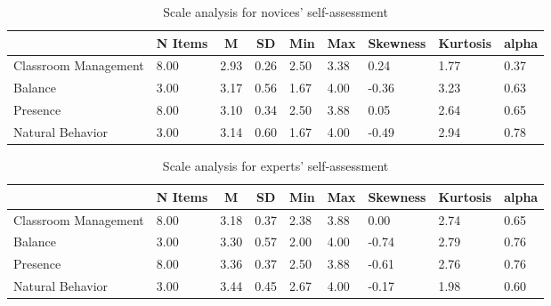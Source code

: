 \documentclass[
  man]{apa6}
\begin{document}
\begin{table}[h]

\begin{center}
\begin{threeparttable}

\caption{\label{tab:presence_questionnaire_novices}Scale analysis for novices' self-assessment}

\tiny{

\begin{tabular}{lllllllll}
\toprule
 & \multicolumn{1}{c}{N Items} & \multicolumn{1}{c}{M} & \multicolumn{1}{c}{SD} & \multicolumn{1}{c}{Min} & \multicolumn{1}{c}{Max} & \multicolumn{1}{c}{Skewness} & \multicolumn{1}{c}{Kurtosis} & \multicolumn{1}{c}{alpha}\\
\midrule
Classroom Management & 8.00 & 2.93 & 0.26 & 2.50 & 3.38 & 0.24 & 1.77 & 0.37\\
Balance & 3.00 & 3.17 & 0.56 & 1.67 & 4.00 & -0.36 & 3.23 & 0.63\\
Presence & 8.00 & 3.10 & 0.34 & 2.50 & 3.88 & 0.05 & 2.64 & 0.65\\
Natural Behavior & 3.00 & 3.14 & 0.60 & 1.67 & 4.00 & -0.49 & 2.94 & 0.78\\
\bottomrule
\end{tabular}

}

\end{threeparttable}
\end{center}

\end{table}

\begin{table}[h]

\begin{center}
\begin{threeparttable}

\caption{\label{tab:presence_questionnaire_experts}Scale analysis for experts' self-assessment}

\tiny{

\begin{tabular}{lllllllll}
\toprule
 & \multicolumn{1}{c}{N Items} & \multicolumn{1}{c}{M} & \multicolumn{1}{c}{SD} & \multicolumn{1}{c}{Min} & \multicolumn{1}{c}{Max} & \multicolumn{1}{c}{Skewness} & \multicolumn{1}{c}{Kurtosis} & \multicolumn{1}{c}{alpha}\\
\midrule
Classroom Management & 8.00 & 3.18 & 0.37 & 2.38 & 3.88 & 0.00 & 2.74 & 0.65\\
Balance & 3.00 & 3.30 & 0.57 & 2.00 & 4.00 & -0.74 & 2.79 & 0.76\\
Presence & 8.00 & 3.36 & 0.37 & 2.50 & 3.88 & -0.61 & 2.76 & 0.76\\
Natural Behavior & 3.00 & 3.44 & 0.45 & 2.67 & 4.00 & -0.17 & 1.98 & 0.60\\
\bottomrule
\end{tabular}

}

\end{threeparttable}
\end{center}

\end{table}
\end{document}
